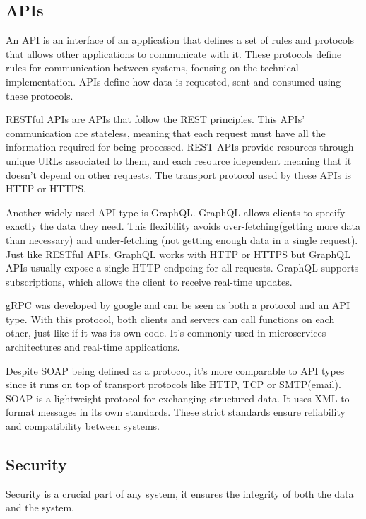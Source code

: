 \subsection{APIs}
An \gls{API} is an interface of an application that defines a set of rules and
protocols that allows other applications to communicate with it.
These protocols define rules for communication between systems, focusing on the
technical implementation. \gls{API}s define how data is requested, sent and
consumed using these protocols.

\gls{REST}ful \gls{API}s are \gls{API}s that follow the \gls{REST} principles.
This \gls{API}s' communication are stateless, meaning that each request must
have all the information required for being processed.
\gls{REST} \gls{API}s provide resources through unique \gls{URL}s associated to them, and
each resource idependent meaning that it doesn't depend on other
requests. The transport protocol used by these \gls{API}s is \gls{HTTP} or \gls{HTTPS}.

Another widely used API type is GraphQL.
GraphQL allows clients to specify exactly the data they need. This
flexibility avoids over-fetching(getting more data than necessary) and
under-fetching (not getting enough data in a single request).
Just like \gls{REST}ful \gls{API}s, GraphQL works with \gls{HTTP} or \gls{HTTPS}
but GraphQL \gls{API}s usually expose a single \gls{HTTP} endpoing for all
requests. GraphQL supports subscriptions, which allows the client to receive
real-time updates.

\gls{gRPC} was developed by google and can be seen as both a protocol and an
\gls{API} type. With this protocol, both clients and servers can call
functions on each other, just like if it was its own code.
It's commonly used in microservices architectures and real-time applications.

Despite \gls{SOAP} being defined as a protocol, it's more comparable to \gls{API}
types since it runs on top of transport protocols like \gls{HTTP}, \gls{TCP} or
\gls{SMTP}(email).
\gls{SOAP} is a lightweight protocol for exchanging structured data. It uses \gls{XML}
to format messages in its own standards. These strict standards ensure
reliability and compatibility between systems.

\subsection{Security}

Security is a crucial part of any system, it ensures the integrity of both
the data and the system.

